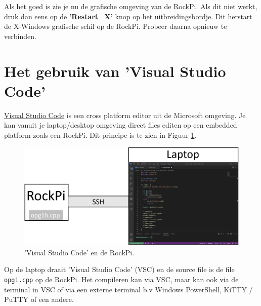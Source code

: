 \newline
Als het goed is zie je nu de grafische omgeving van de RockPi. Als dit niet werkt, druk dan eens op de \textbf{'Restart\_X'} knop op het uitbreidingsbordje. Dit herstart de X-Windows grafische schil op de RockPi. Probeer daarna opnieuw te verbinden.

	

\section{Het gebruik van 'Visual Studio Code'} \label{app:vsc}
\label{sec:vsc}
\href{https://code.visualstudio.com/docs}{Visual Studio Code} is een cross platform editor uit de Microsoft omgeving. Je kan vanuit je laptop/desktop omgeving direct files editen op een embedded platform zoals een RockPi. Dit principe is te zien in Figuur \ref{fig:winVCS}.
	\begin{figure}[h!]
	\captionsetup{justification=centering}
	\includegraphics[width=0.65 \linewidth]{figuren/laptopVCS}
	\centering
	\caption{'Visual Studio Code' en de RockPi.}
	\label{fig:winVCS}
\end{figure}
Op de laptop draait 'Visual Studio Code' (VSC) en de source file is de file \texttt{opg1.cpp} op de RockPi. Het compileren kan via VSC, maar kan ook via de terminal in VSC of via een externe terminal b.v Windows PowerShell, KiTTY / PuTTY of een andere.
 

